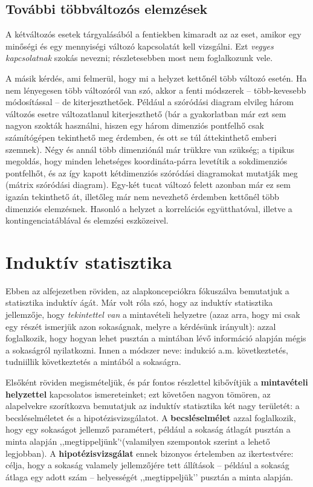 \documentclass[]{book}
\begin{document}
\section{További többváltozós
elemzések}\label{deskriptivtovabbitobbvalt}

A kétváltozós esetek tárgyalásából a fentiekben kimaradt az az eset,
amikor egy minőségi és egy mennyiségi változó kapcsolatát kell
vizsgálni. Ezt \emph{vegyes kapcsolatnak} szokás nevezni; részletesebben
most nem foglalkozunk vele.

A másik kérdés, ami felmerül, hogy mi a helyzet kettőnél több változó
esetén. Ha nem lényegesen több változóról van szó, akkor a fenti
módszerek -- több-kevesebb módosítással -- de kiterjeszthetőek. Például
a szóródási diagram elvileg három változós esetre változatlanul
kiterjeszthető (bár a gyakorlatban már ezt sem nagyon szokták használni,
hiszen egy három dimenziós pontfelhő csak számítógépen tekinthető meg
érdemben, és ott se túl áttekinthető emberi szemnek). Négy és annál több
dimenziónál már trükkre van szükség; a tipikus megoldás, hogy minden
lehetséges koordináta-párra levetítik a sokdimenziós pontfelhőt, és az
így kapott kétdimenziós szóródási diagramokat mutatják meg (mátrix
szóródási diagram). Egy-két tucat változó felett azonban már ez sem
igazán tekinthető át, illetőleg már nem nevezhető érdemben kettőnél több
dimenziós elemzésnek. Hasonló a helyzet a korrelációs együtthatóval,
illetve a kontingenciatáblával és elemzési eszközeivel.

\chapter{Induktív statisztika}\label{induktiv}

Ebben az alfejezetben röviden, az alapkoncepciókra fókuszálva bemutatjuk
a statisztika induktív ágát. Már volt róla szó, hogy az induktív
statisztika jellemzője, hogy \emph{tekintettel van} a mintavételi
helyzetre (azaz arra, hogy mi csak egy részét ismerjük azon sokaságnak,
melyre a kérdésünk irányult): azzal foglalkozik, hogy hogyan lehet
pusztán a mintában lévő információ alapján mégis a sokaságról
nyilatkozni. Innen a módszer neve: indukció a.m. következtetés,
tudniillik következtetés a mintából a sokaságra.

Elsőként röviden megismételjük, és pár fontos részlettel kibővítjük a
\textbf{mintavételi helyzettel} kapcsolatos ismereteinket; ezt követően
nagyon tömören, az alapelvekre szorítkozva bemutatjuk az induktív
statisztika két nagy területét: a becsléselméletet és a
hipotézisvizsgálatot. A \textbf{becsléselmélet} azzal foglalkozik, hogy
egy sokaságot jellemző paramétert, például a sokaság átlagát pusztán a
minta alapján ,,megtippeljünk'`(valamilyen szempontok szerint a lehető
legjobban). A \textbf{hipotézisvizsgálat} ennek bizonyos értelemben az
ikertestvére: célja, hogy a sokaság valamely jellemzőjére tett állítások
-- például a sokaság átlaga egy adott szám -- helyességét
,,megtippeljük'' pusztán a minta alapján.
\end{document}
